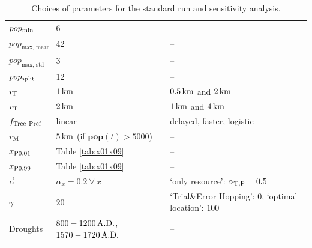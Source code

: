 \begin{table}
\begin{tabular}{l|L|K}
		  $pop_{\rm min}$ & 6 & --\\
		  $pop_\text{max, mean}$ & 42 & --\\
		  $pop_\text{max, std}$ & 3 & -- \\
		  $pop_{\rm split}$ & 12 & --\\ \hline
		  $r_{\rm F}$ & $1\, {\rm km}$ & $0.5\, {\rm km}$ and $2\, {\rm km}$\\
		  $r_{\rm T}$ & $2\, {\rm km}$ & $1\, {\rm km}$ and $4\, {\rm km}$  \\ \hline 
		  $f_{\rm Tree\  Pref}$ & linear & delayed, faster, logistic\\ \hline 
		  $r_{\rm M}$ & $5\, {\rm km}$ (if $\mathbf{pop}(t)>5000$) & -- \\
		  $x_{\rm P0.01}$ & Table \ref{tab:x01x09} & -- \\
		  $x_{\rm P0.99}$ & Table \ref{tab:x01x09} & -- \\
		  $\vec{\alpha}$ & $\alpha_x=0.2 \ \forall \ x$ & `only resource': $\alpha_{\rm T,F} = 0.5$\\
		  
		  $\gamma$ & $20$ & `Trial\&Error Hopping': $0$, `optimal location': $100$ \\
		  Droughts & $800-1200\, {\rm A.D.}$, $1570-1720\, {\rm A.D.}$ & -- \\
	\end{tabular}
	\caption{Choices of parameters for the standard run and sensitivity analysis. %
	}
	\label{tab:sensitivity}
\end{table}

